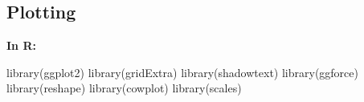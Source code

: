 \documentclass[
  11pt,
  oneside]{book}
\newenvironment{Shaded}{\begin{snugshade}}{\end{snugshade}}
\newcommand{\FunctionTok}[1]{\textcolor[rgb]{0.00,0.00,0.00}{#1}}
\newcommand{\NormalTok}[1]{#1}
\begin{document}
\hypertarget{plotting-5}{%
\subsection{Plotting}\label{plotting-5}}

\textbf{In R: }

\begin{Shaded}
\begin{Highlighting}[]
\FunctionTok{library}\NormalTok{(ggplot2)}
\FunctionTok{library}\NormalTok{(gridExtra)}
\FunctionTok{library}\NormalTok{(shadowtext)}
\FunctionTok{library}\NormalTok{(ggforce)}
\FunctionTok{library}\NormalTok{(reshape)}
\FunctionTok{library}\NormalTok{(cowplot)}
\FunctionTok{library}\NormalTok{(scales)}
\end{Highlighting}
\end{Shaded}
\end{document}
